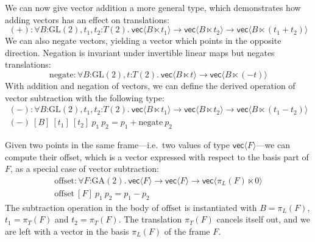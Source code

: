 \documentclass{article}
\newcommand{\GA}{\mathrm{GA}}
\newcommand{\GL}{\mathrm{GL}}
\begin{document}
We can now give vector addition a more general type, which
demonstrates how adding vectors has an effect on translations:
\begin{displaymath}
  (+) : \forall B \mathord: \GL(2), t_1, t_2 \mathord: T(2).\ \mathsf{vec}\langle B \ltimes t_1\rangle \to \mathsf{vec}\langle B \ltimes t_2 \rangle \to \mathsf{vec}\langle B \ltimes (t_1 + t_2)\rangle
\end{displaymath}
We can also negate vectors, yielding a vector which points in the
opposite direction. Negation is invariant under invertible linear maps
but negates translations:
\begin{displaymath}
  \mathrm{negate} : \forall B \mathord: \GL(2), t \mathord: T(2).\ \mathsf{vec}\langle B \ltimes t\rangle \to \mathsf{vec}\langle B\ltimes(-t)\rangle
\end{displaymath}
With addition and negation of vectors, we can define the derived
operation of vector subtraction with the following type:
\begin{displaymath}
  \begin{array}{l}
    (-) : \forall B \mathord:\GL(2), t_1,t_2 \mathord:T(2).\ \mathsf{vec}\langle B \ltimes t_1\rangle \to \mathsf{vec}\langle B \ltimes t_2\rangle \to \mathsf{vec}\langle B \ltimes (t_1 - t_2)\rangle \\
    (-)\ [B]\ [t_1]\ [t_2]\ p_1\ p_2 = p_1 + \mathrm{negate}\ p_2
\end{array}
\end{displaymath}

Given two points in the same frame---i.e.~two values of type
$\mathsf{vec}\langle F \rangle$---we can compute their offset, which
is a vector expressed with respect to the basis part of $F$, as a
special case of vector subtraction:
\begin{displaymath}
  \begin{array}{l}
    \mathrm{offset} : \forall F \mathord:\GA(2).\ \mathsf{vec}\langle F \rangle \to \mathsf{vec}\langle F \rangle \to \mathsf{vec}\langle \pi_L(F) \ltimes 0 \rangle \\
    \mathrm{offset}\ [F]\ p_1\ p_2 = p_1 - p_2
  \end{array}
\end{displaymath}
The subtraction operation in the body of $\mathrm{offset}$ is
instantiated with $B = \pi_L(F)$, $t_1 = \pi_T(F)$ and $t_2 =
\pi_T(F)$. The translation $\pi_T(F)$ cancels itself out, and we are
left with a vector in the basis $\pi_L(F)$ of the frame $F$.
\end{document}
